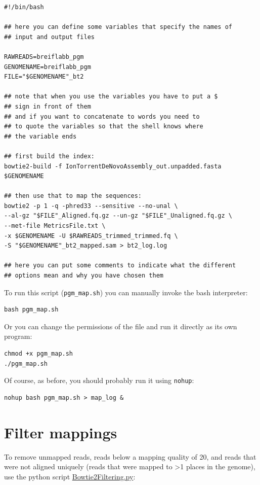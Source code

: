 \documentclass[11pt]{article}
\begin{document}
\begin{verbatim}
#!/bin/bash

## here you can define some variables that specify the names of
## input and output files

RAWREADS=breiflabb_pgm
GENOMENAME=breiflabb_pgm
FILE="$GENOMENAME"_bt2

## note that when you use the variables you have to put a $
## sign in front of them
## and if you want to concatenate to words you need to
## to quote the variables so that the shell knows where
## the variable ends

## first build the index:
bowtie2-build -f IonTorrentDeNovoAssembly_out.unpadded.fasta $GENOMENAME

## then use that to map the sequences:
bowtie2 -p 1 -q -phred33 --sensitive --no-unal \
--al-gz "$FILE"_Aligned.fq.gz --un-gz "$FILE"_Unaligned.fq.gz \
--met-file MetricsFile.txt \
-x $GENOMENAME -U $RAWREADS_trimmed_trimmed.fq \
-S "$GENOMENAME"_bt2_mapped.sam > bt2_log.log

## here you can put some comments to indicate what the different
## options mean and why you have chosen them
\end{verbatim}

To run this script (\texttt{pgm\_map.sh}) you can manually invoke the bash
interpreter:

\begin{verbatim}
bash pgm_map.sh
\end{verbatim}

Or you can change the permissions of the file and run it directly as its own program:

\begin{verbatim}
chmod +x pgm_map.sh
./pgm_map.sh
\end{verbatim}

Of course, as before, you should probably run it using \texttt{nohup}:

\begin{verbatim}
nohup bash pgm_map.sh > map_log &
\end{verbatim}

\section{Filter mappings}
\label{sec:orgheadline6}
To remove unmapped reads, reads below a mapping quality of 20, and
reads that were not aligned uniquely (reads that were mapped to >1
places in the genome), use the python script \href{http://marinetics.org/2015/03/03/Bowtie2Filtering.html}{Bowtie2Filtering.py}:
\end{document}

